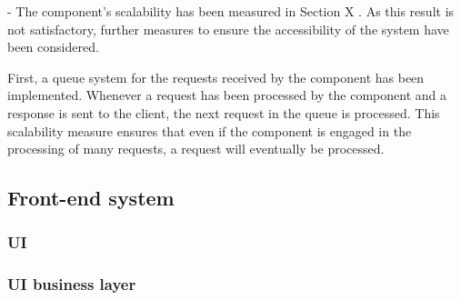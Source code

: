 - The component's scalability has been measured in Section X . As this result is not satisfactory, further measures to ensure the accessibility of the system have been considered. 

First, a queue system for the requests received by the component has been implemented. 
Whenever a request has been processed by the component and a response is sent to the client, the next request in the queue is processed. 
This scalability measure ensures that even if the component is engaged in the processing of many requests, a request will eventually be processed.

\subsection{Front-end system}

\subsubsection{UI}

\subsubsection{UI business layer}